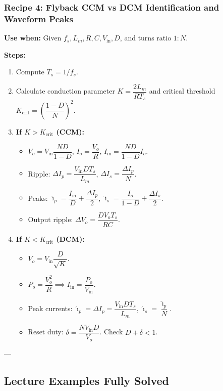 \subsubsection{Recipe 4: Flyback CCM vs DCM Identification and Waveform Peaks}
\textbf{Use when:} Given $f_s, L_m, R, C, V_{\mathrm{in}}, D$, and turns ratio $1:N$.

\textbf{Steps:}
\begin{enumerate}
  \item Compute $T_s = 1/f_s$.
  \item Calculate conduction parameter $K = \dfrac{2 L_m}{R T_s}$ and critical threshold $K_{\mathrm{crit}} = \left(\dfrac{1-D}{N}\right)^2$.
  \item \textbf{If $K > K_{\mathrm{crit}}$ (CCM):}
  \begin{itemize}
    \item $V_o = V_{\mathrm{in}} \dfrac{N D}{1-D}$, \quad $I_o = \dfrac{V_o}{R}$, \quad $I_{\mathrm{in}} = \dfrac{N D}{1-D} I_o$.
    \item Ripple: $\Delta I_p = \dfrac{V_{\mathrm{in}} D T_s}{L_m}$, \quad $\Delta I_s = \dfrac{\Delta I_p}{N}$.
    \item Peaks: $\hat{\imath}_p = \dfrac{I_{\mathrm{in}}}{D} + \dfrac{\Delta I_p}{2}$, \quad $\hat{\imath}_s = \dfrac{I_o}{1-D} + \dfrac{\Delta I_s}{2}$.
    \item Output ripple: $\Delta V_o = \dfrac{D V_o T_s}{R C}$.
  \end{itemize}
  \item \textbf{If $K < K_{\mathrm{crit}}$ (DCM):}
  \begin{itemize}
    \item $V_o = V_{\mathrm{in}} \dfrac{D}{\sqrt{K}}$.
    \item $P_o = \dfrac{V_o^2}{R} \implies I_{\mathrm{in}} = \dfrac{P_o}{V_{\mathrm{in}}}$.
    \item Peak currents: $\hat{\imath}_p = \Delta I_p = \dfrac{V_{\mathrm{in}} D T_s}{L_m}$, \quad $\hat{\imath}_s = \dfrac{\hat{\imath}_p}{N}$.
    \item Reset duty: $\delta = \dfrac{N V_{\mathrm{in}} D}{V_o}$. Check $D + \delta < 1$.
  \end{itemize}
\end{enumerate}

---

\subsection{Lecture Examples Fully Solved}

